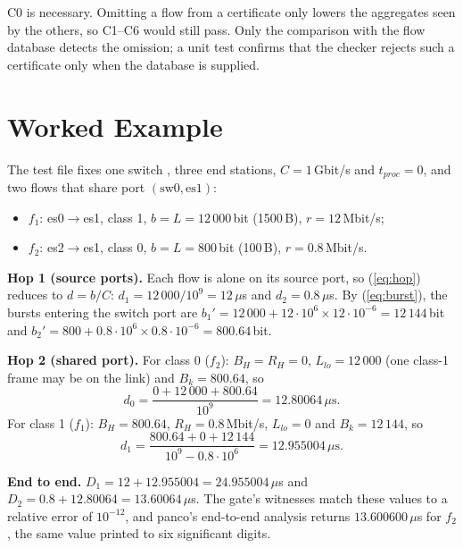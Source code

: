 \documentclass[9pt,a4paper,twocolumn,twoside]{tau-class/tau}
\providecommand{\eqref}[1]{(\ref{#1})}
\begin{document}
        \begin{note}
            C0 is necessary. Omitting a flow from a certificate only lowers the aggregates seen by the others, so C1--C6 would still pass. Only the comparison with the flow database detects the omission; a unit test confirms that the checker rejects such a certificate only when the database is supplied.
        \end{note}


\section{Worked Example}
\label{sec:example}

    The test file  fixes one switch , three end stations, $C = 1$\,Gbit/s and $t_{proc} = 0$, and two flows that share port $(\mathrm{sw0}, \mathrm{es1})$:
    \begin{itemize}
        \item $f_1$: es0$\to$es1, class 1, $b = L = 12\,000$\,bit (1500\,B), $r = 12$\,Mbit/s;
        \item $f_2$: es2$\to$es1, class 0, $b = L = 800$\,bit (100\,B), $r = 0.8$\,Mbit/s.
    \end{itemize}

    \textbf{Hop 1 (source ports).} Each flow is alone on its source port, so \eqref{eq:hop} reduces to $d = b/C$: $d_1 = 12\,000/10^9 = 12\,\mu$s and $d_2 = 0.8\,\mu$s. By \eqref{eq:burst}, the bursts entering the switch port are $b_1' = 12\,000 + 12\cdot10^6 \times 12\cdot10^{-6} = 12\,144$\,bit and $b_2' = 800 + 0.8\cdot10^6 \times 0.8\cdot10^{-6} = 800.64$\,bit.

    \textbf{Hop 2 (shared port).} For class 0 ($f_2$): $B_H = R_H = 0$, $L_{lo} = 12\,000$ (one class-1 frame may be on the link) and $B_k = 800.64$, so
    \begin{equation}
        d_0 = \frac{0 + 12\,000 + 800.64}{10^9} = 12.80064\,\mu\mathrm{s}.
    \end{equation}
    For class 1 ($f_1$): $B_H = 800.64$, $R_H = 0.8$\,Mbit/s, $L_{lo} = 0$ and $B_k = 12\,144$, so
    \begin{equation}
        d_1 = \frac{800.64 + 0 + 12\,144}{10^9 - 0.8\cdot10^6} = 12.955004\,\mu\mathrm{s}.
    \end{equation}

    \textbf{End to end.} $D_1 = 12 + 12.955004 = 24.955004\,\mu$s and $D_2 = 0.8 + 12.80064 = 13.60064\,\mu$s. The gate's witnesses match these values to a relative error of $10^{-12}$, and panco's end-to-end analysis returns $13.600600\,\mu$s for $f_2$, the same value printed to six significant digits.
\end{document}
